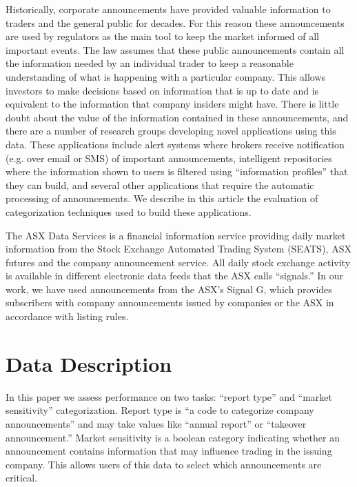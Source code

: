 \documentclass[a4paper,twocolumn]{article}
\begin{document}
Historically, corporate announcements have provided valuable information to traders and the general public for decades. For this reason these announcements are used by regulators as the main tool to keep the market informed of all important events. The law assumes that these public announcements contain all the information needed by an individual trader to keep a reasonable understanding of what is happening with a particular company. This allows investors to make decisions based on information that is up to date and is equivalent to the information that company insiders might have. There is little doubt about the value of the information contained in these announcements, and there are a number of research groups developing novel applications using this data. These applications include alert systems where brokers receive notification (e.g. over email or SMS) of important announcements, intelligent repositories where the information shown to users is filtered using ``information profiles'' that they can build, and several other applications that require the automatic processing of announcements.  We describe in this article the evaluation of categorization techniques used to build these applications.

The ASX Data Services is a financial information service providing daily market information from the Stock Exchange Automated Trading System (SEATS), ASX futures and the company announcement service.  All daily stock exchange activity is available in different electronic data feeds that the ASX calls ``signals.''  In our work, we have used announcements from the ASX's Signal G, which provides subscribers with company announcements issued by companies or the ASX in accordance with listing rules.

\section{Data Description}
\label{data}

In this paper we assess performance on two tasks: ``report type'' and ``market sensitivity'' categorization. Report type is ``a code to categorize company announcements'' \cite{asx:02} and may take values like ``annual report'' or ``takeover announcement.'' Market sensitivity is a boolean category indicating whether an announcement contains information that may influence trading in the issuing company. This allows users of this data to select which announcements are critical.
\end{document}
